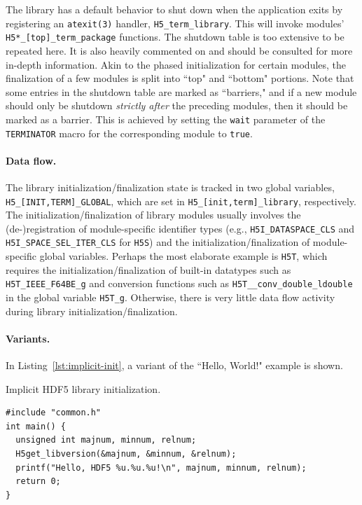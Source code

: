 The library has a default behavior to shut down when the application exits by registering an \texttt{atexit(3)} handler, \texttt{H5\_term\_library}. This will invoke modules' \texttt{H5*\_[top]\_term\_package} functions. The shutdown table is too extensive to be repeated here. It is also heavily commented on and should be consulted for more in-depth information. Akin to the phased initialization for certain modules, the finalization of a few modules is split into ``top" and ``bottom" portions. Note that some entries in the shutdown table are marked as ``barriers," and if a new module should only be shutdown \textit{strictly after} the preceding modules, then it should be marked as a barrier. This is achieved by setting the \texttt{wait} parameter of the \texttt{TERMINATOR} macro for the corresponding module to \texttt{true}.

\paragraph{Data flow.} The library initialization/finalization state is tracked in two global variables, \texttt{H5\_[INIT,TERM]\_GLOBAL}, which are set in \texttt{H5\_[init,term]\_library}, respectively. The initialization/finalization of library modules usually involves the (de-)registration of module-specific identifier types (e.g., \texttt{H5I\_DATASPACE\_CLS} and \texttt{H5I\_SPACE\_SEL\_ITER\_CLS} for \texttt{H5S}) and the initialization/finalization of module-specific global variables. Perhaps the most elaborate example is \texttt{H5T}, which requires the initialization/finalization of built-in datatypes such as \texttt{H5T\_IEEE\_F64BE\_g} and conversion functions such as \texttt{H5T\_\_conv\_double\_ldouble} in the global variable \texttt{H5T\_g}. Otherwise, there is very little data flow activity during library initialization/finalization.

\paragraph{Variants.} In Listing~\ref{lst:implicit-init}, a variant of the ``Hello, World!" example is shown.

\begin{listing}
\centering
\caption{Implicit HDF5 library initialization.}
\label{lst:implicit-init}
\begin{verbatim}
#include "common.h"
int main() {
  unsigned int majnum, minnum, relnum;
  H5get_libversion(&majnum, &minnum, &relnum);
  printf("Hello, HDF5 %u.%u.%u!\n", majnum, minnum, relnum);
  return 0;
}
\end{verbatim}
\end{listing}

